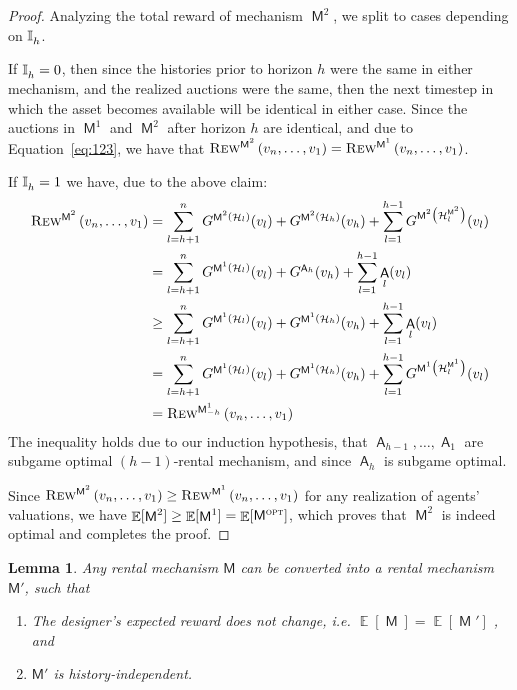 \documentclass[11pt,letterpaper]{article}
\newcommand{\sqbr}[1]{\left[ #1 \right]}
\newcommand{\brackets}[1]{\left( #1 \right)}
\DeclareMathOperator*{\E}{\bb{E}}
\DeclareMathOperator{\history}{\mathcal{H}}
\newcommand{\bb}[1]{\mathbb{#1}}
\DeclareMathOperator{\A}{\auc{A}}
\DeclareMathOperator{\M}{\mech{M}}
\newcommand{\sumof}[3]{\sum_{{#1}={#2}}^{#3}\limits}
\theoremstyle{plain}
\newtheorem{lemma}[theorem]{Lemma}
\newcommand{\auc}[1]{\mathsf{#1}}
\newcommand{\mech}[1]{\mathsf{#1}}
\begin{document}
\begin{proof}
     Analyzing the total reward of mechanism $\M^2$, we split to cases depending on $\ind{h}$.
     
     If $\ind{h}=0$, then since the histories prior to horizon $h$ were the same in either mechanism, and the realized auctions were the same, then the next timestep in which the asset becomes available will be identical in either case. Since the auctions in $\M^1$ and $\M^2$ after horizon $h$ are identical, and due to Equation~\ref{eq:123}, we have that $\trew[\M^2]{v_n,\dots,v_1}=\trew[\M^1]{v_n,\dots,v_1}$.

     If $\ind{h}=1$ we have, due to the above claim:
     \begin{align*}
         \trew[\M^2]{v_n,\dots,v_1}&=\sumof{l}{h+1}{n}G^{\M^2(\history_l)}(v_l)+G^{\M^2(\history_h)}(v_h)+\sumof{l}{1}{h-1}G^{\M^2\brackets{\history_l^{\M^2}}}(v_l)\\
         &=\sumof{l}{h+1}{n}G^{\M^1(\history_l)}(v_l)+G^{\A_h}(v_h)+\sumof{l}{1}{h-1}\A_l(v_l)\\
         &\geq\sumof{l}{h+1}{n}G^{\M^1(\history_l)}(v_l)+G^{\M^1(\history_h)}(v_h)+\sumof{l}{1}{h-1}\A_l(v_l)\\
         &=\sumof{l}{h+1}{n}G^{\M^1(\history_l)}(v_l)+G^{\M^1(\history_h)}(v_h)+\sumof{l}{1}{h-1}G^{\M^1\brackets{\history_l^{\M^1}}}(v_l)\\
         &=\trew[\M^1_{-h}]{v_n,\dots,v_1}
     \end{align*}
    The inequality holds due to our induction hypothesis, that $\A_{h-1},\dots,\A_1$ are subgame optimal $(h-1)$-rental mechanism, and since $\A_h$ is subgame optimal.


     Since $\trew[\M^2]{v_n,\dots,v_1}\geq\trew[\M^1]{v_n,\dots,v_1}$ for any realization of agents' valuations, we have $\E[\M^2]\geq\E[\M^1]=\E[\mopt]$,
    which proves that $\M^2$ is indeed optimal and completes the proof.
    
    \end{proof} 

\begin{lemma}\label{lemma:rental_history_independent}
Any rental mechanism
$\mech{M}$
can be converted
into a rental mechanism $\mech{M}'$,
such that
\begin{enumerate}
\item The designer's expected reward does not change, i.e. $\E\sqbr{\M}=\E\sqbr{\M'}$ ,
and
\item $\mech{M'}$ is history-independent.
\end{enumerate}

\end{lemma}
\end{document}
